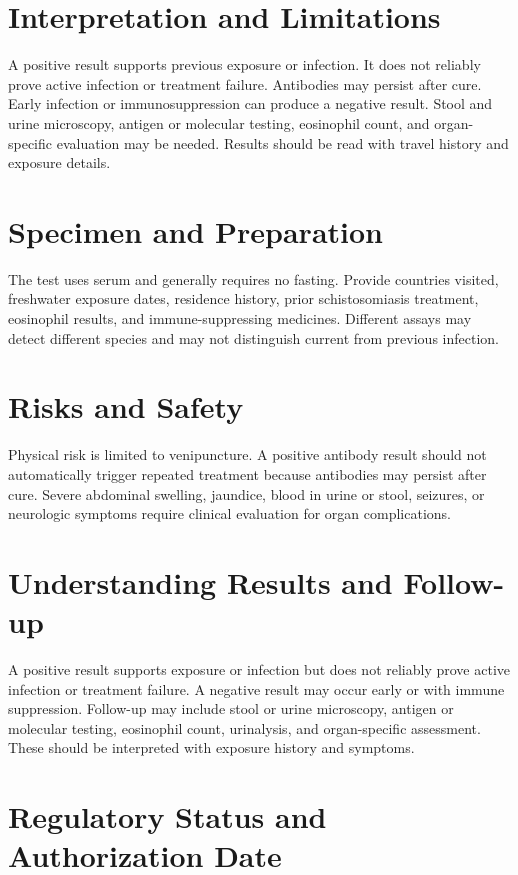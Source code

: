 \section*{Interpretation and Limitations}
A positive result supports previous exposure or infection. It does not reliably prove active infection or treatment failure. Antibodies may persist after cure. Early infection or immunosuppression can produce a negative result. Stool and urine microscopy, antigen or molecular testing, eosinophil count, and organ-specific evaluation may be needed. Results should be read with travel history and exposure details.
\section*{Specimen and Preparation}
The test uses serum and generally requires no fasting. Provide countries visited, freshwater exposure dates, residence history, prior schistosomiasis treatment, eosinophil results, and immune-suppressing medicines. Different assays may detect different species and may not distinguish current from previous infection.

\section*{Risks and Safety}
Physical risk is limited to venipuncture. A positive antibody result should not automatically trigger repeated treatment because antibodies may persist after cure. Severe abdominal swelling, jaundice, blood in urine or stool, seizures, or neurologic symptoms require clinical evaluation for organ complications.

\section*{Understanding Results and Follow-up}
A positive result supports exposure or infection but does not reliably prove active infection or treatment failure. A negative result may occur early or with immune suppression. Follow-up may include stool or urine microscopy, antigen or molecular testing, eosinophil count, urinalysis, and organ-specific assessment. These should be interpreted with exposure history and symptoms.

\section*{Regulatory Status and Authorization Date}

\clearpage
